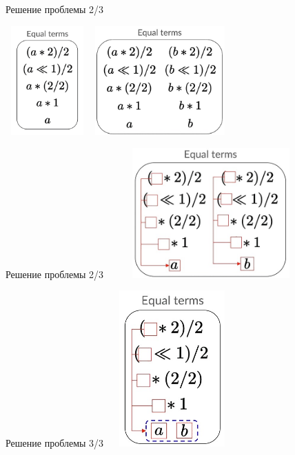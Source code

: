 \documentclass[aspectratio=169
  , xcolor={svgnames}
  , russian  %
  ]{beamer}
\begin{document}
\begin{frame}{Решение проблемы 2/3}
    \begin{center}
            \includegraphics[width=3.2cm, height=4.2cm]{misc/egraphs_images/1_11new.png}
            \hspace{0.5cm}
            \hspace{0.5cm}
            \includegraphics[width=5.2cm, height=4.2cm]{misc/egraphs_images/1_22new.jpg}
    \end{center}
\end{frame}

\begin{frame}{Решение проблемы 2/3}
    \centering
        \includegraphics[width=8cm, height=5cm]{misc/egraphs_images/shared_im.jpg}
\end{frame}

\begin{frame}{Решение проблемы 3/3}
    \centering
        \includegraphics[width=5cm, height=6cm]{misc/egraphs_images/eclass_new.jpg}
\end{frame}
\end{document}
